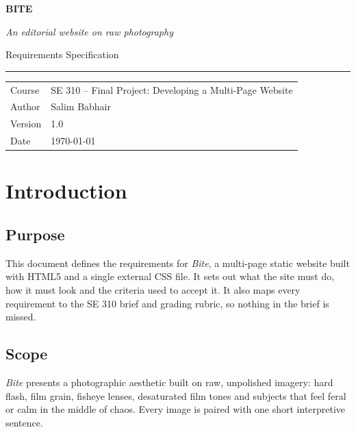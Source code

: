 \documentclass[11pt,a4paper]{article}
\begin{document}
\begin{titlepage}
  \centering
  \vspace*{3cm}
  {\Huge\bfseries\color{ink} BITE\par}
  \vspace{0.4cm}
  {\Large\itshape\color{muted} An editorial website on raw photography\par}
  \vspace{1.5cm}
  {\large Requirements Specification\par}
  \vspace{0.3cm}
  {\color{accent}\rule{0.4\textwidth}{1.5pt}\par}
  \vspace{1.5cm}
  \begin{tabular}{ll}
    Course & SE 310 -- Final Project: Developing a Multi-Page Website \\
    Author & Salim Babhair \\
    Version & 1.0 \\
    Date & \today \\
  \end{tabular}
  \vfill
\end{titlepage}

\tableofcontents
\newpage

\section{Introduction}

\subsection{Purpose}
This document defines the requirements for \textit{Bite}, a multi-page static website built
with HTML5 and a single external CSS file. It sets out what the site must do, how it must
look and the criteria used to accept it. It also maps every requirement to the SE 310
brief and grading rubric, so nothing in the brief is missed.

\subsection{Scope}
\textit{Bite} presents a photographic aesthetic built on raw, unpolished imagery: hard flash,
film grain, fisheye lenses, desaturated film tones and subjects that feel feral or calm in
the middle of chaos. Every image is paired with one short interpretive sentence.
\end{document}
